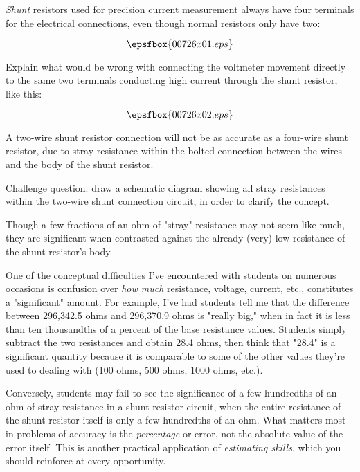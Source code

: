 

{\it Shunt} resistors used for precision current measurement always have four terminals for the electrical connections, even though normal resistors only have two:

$$\epsfbox{00726x01.eps}$$

Explain what would be wrong with connecting the voltmeter movement directly to the same two terminals conducting high current through the shunt resistor, like this:

$$\epsfbox{00726x02.eps}$$







A two-wire shunt resistor connection will not be as accurate as a four-wire shunt resistor, due to stray resistance within the bolted connection between the wires and the body of the shunt resistor.

\vskip 10pt

Challenge question: draw a schematic diagram showing all stray resistances within the two-wire shunt connection circuit, in order to clarify the concept.







Though a few fractions of an ohm of "stray" resistance may not seem like much, they are significant when contrasted against the already (very) low resistance of the shunt resistor's body.

One of the conceptual difficulties I've encountered with students on numerous occasions is confusion over {\it how much} resistance, voltage, current, etc., constitutes a "significant" amount.  For example, I've had students tell me that the difference between 296,342.5 ohms and 296,370.9 ohms is "really big," when in fact it is less than ten thousandths of a percent of the base resistance values.  Students simply subtract the two resistances and obtain 28.4 ohms, then think that "28.4" is a significant quantity because it is comparable to some of the other values they're used to dealing with (100 ohms, 500 ohms, 1000 ohms, etc.).

Conversely, students may fail to see the significance of a few hundredths of an ohm of stray resistance in a shunt resistor circuit, when the entire resistance of the shunt resistor itself is only a few hundredths of an ohm.  What matters most in problems of accuracy is the {\it percentage} or error, not the absolute value of the error itself.  This is another practical application of {\it estimating skills}, which you should reinforce at every opportunity.




